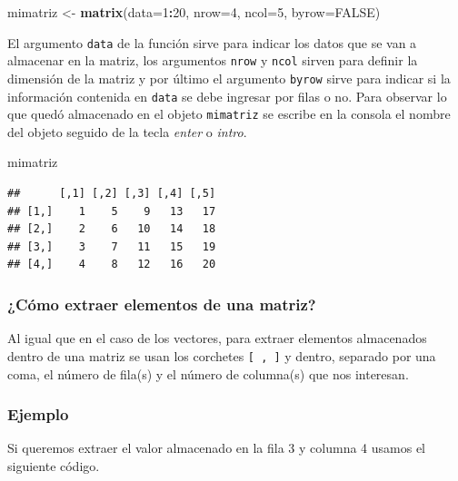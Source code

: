 \documentclass[10pt,]{krantz}
\makeatletter
\newenvironment{Shaded}{\begin{snugshade}}{\end{snugshade}}
\newcommand{\KeywordTok}[1]{\textcolor[rgb]{0.13,0.29,0.53}{\textbf{#1}}}
\newcommand{\DataTypeTok}[1]{\textcolor[rgb]{0.13,0.29,0.53}{#1}}
\newcommand{\DecValTok}[1]{\textcolor[rgb]{0.00,0.00,0.81}{#1}}
\newcommand{\StringTok}[1]{\textcolor[rgb]{0.31,0.60,0.02}{#1}}
\newcommand{\OtherTok}[1]{\textcolor[rgb]{0.56,0.35,0.01}{#1}}
\newcommand{\OperatorTok}[1]{\textcolor[rgb]{0.81,0.36,0.00}{\textbf{#1}}}
\newcommand{\NormalTok}[1]{#1}
\newenvironment{kframe}{%
\medskip{}
\setlength{\fboxsep}{.8em}
 \def\at@end@of@kframe{}%
 \ifinner\ifhmode%
  \def\at@end@of@kframe{\end{minipage}}%
  \begin{minipage}{\columnwidth}%
 \fi\fi%
 \def\FrameCommand##1{\hskip\@totalleftmargin \hskip-\fboxsep
 \colorbox{shadecolor}{##1}\hskip-\fboxsep
     \hskip-\linewidth \hskip-\@totalleftmargin \hskip\columnwidth}%
 \MakeFramed {\advance\hsize-\width
   \@totalleftmargin\z@ \linewidth\hsize
   \@setminipage}}%
 {\par\unskip\endMakeFramed%
 \at@end@of@kframe}
\renewenvironment{Shaded}{\begin{kframe}}{\end{kframe}}
\makeatother
\begin{document}
\begin{Shaded}
\begin{Highlighting}[]
\NormalTok{mimatriz <-}\StringTok{ }\KeywordTok{matrix}\NormalTok{(}\DataTypeTok{data=}\DecValTok{1}\OperatorTok{:}\DecValTok{20}\NormalTok{, }\DataTypeTok{nrow=}\DecValTok{4}\NormalTok{, }\DataTypeTok{ncol=}\DecValTok{5}\NormalTok{, }\DataTypeTok{byrow=}\OtherTok{FALSE}\NormalTok{)}
\end{Highlighting}
\end{Shaded}

El argumento \texttt{data} de la función sirve para indicar los datos
que se van a almacenar en la matriz, los argumentos \texttt{nrow} y
\texttt{ncol} sirven para definir la dimensión de la matriz y por último
el argumento \texttt{byrow} sirve para indicar si la información
contenida en \texttt{data} se debe ingresar por filas o no. Para
observar lo que quedó almacenado en el objeto \texttt{mimatriz} se
escribe en la consola el nombre del objeto seguido de la tecla
\textit{enter} o \textit{intro}.

\begin{Shaded}
\begin{Highlighting}[]
\NormalTok{mimatriz}
\end{Highlighting}
\end{Shaded}

\begin{verbatim}
##      [,1] [,2] [,3] [,4] [,5]
## [1,]    1    5    9   13   17
## [2,]    2    6   10   14   18
## [3,]    3    7   11   15   19
## [4,]    4    8   12   16   20
\end{verbatim}

\subsubsection{¿Cómo extraer elementos de una
matriz?}\label{como-extraer-elementos-de-una-matriz}

Al igual que en el caso de los vectores, para extraer elementos
almacenados dentro de una matriz se usan los corchetes
\texttt{{[}\ ,\ {]}} y dentro, separado por una coma, el número de
fila(s) y el número de columna(s) que nos interesan.

\subsubsection*{Ejemplo}\label{ejemplo-1}

Si queremos extraer el valor almacenado en la fila 3 y columna 4 usamos
el siguiente código.
\end{document}
